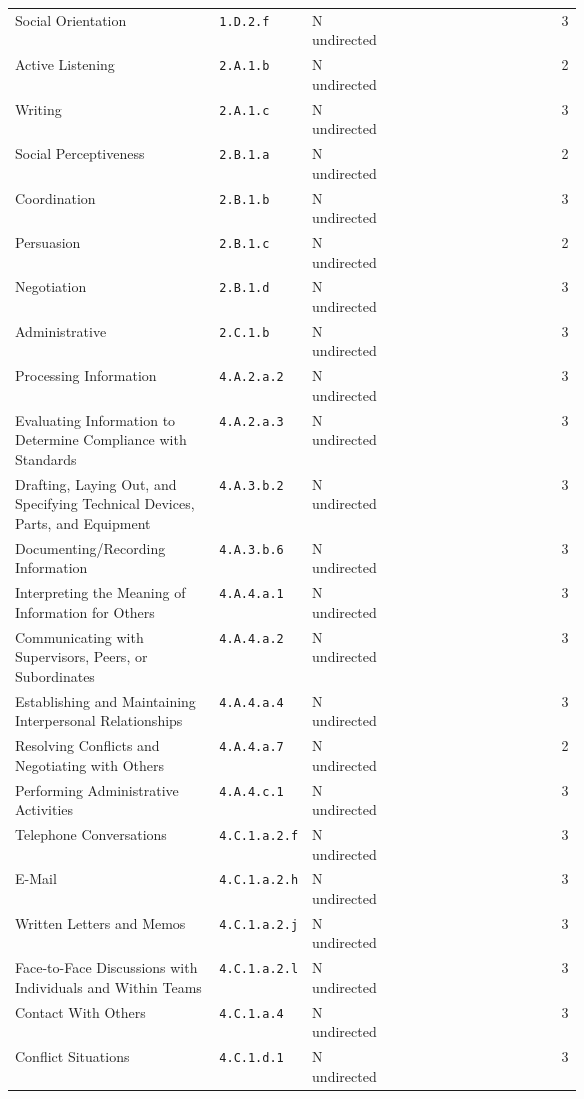 \begin{longtable}[]{@{}p{0.36\linewidth}p{0.15\linewidth}p{0.15\linewidth}cr@{}}
Social Orientation & \texttt{1.D.2.f} & N undirected & & 3 \\
Active Listening & \texttt{2.A.1.b} & N undirected & & 2 \\
Writing & \texttt{2.A.1.c} & N undirected & & 3 \\
Social Perceptiveness & \texttt{2.B.1.a} & N undirected & & 2 \\
Coordination & \texttt{2.B.1.b} & N undirected & & 3 \\
Persuasion & \texttt{2.B.1.c} & N undirected & & 2 \\
Negotiation & \texttt{2.B.1.d} & N undirected & & 3 \\
Administrative & \texttt{2.C.1.b} & N undirected & & 3 \\
Processing Information & \texttt{4.A.2.a.2} & N undirected & & 3 \\
Evaluating Information to Determine Compliance with Standards & \texttt{4.A.2.a.3} & N undirected & & 3 \\
Drafting, Laying Out, and Specifying Technical Devices, Parts, and Equipment & \texttt{4.A.3.b.2} & N undirected & & 3 \\
Documenting/Recording Information & \texttt{4.A.3.b.6} & N undirected & & 3 \\
Interpreting the Meaning of Information for Others & \texttt{4.A.4.a.1} & N undirected & & 3 \\
Communicating with Supervisors, Peers, or Subordinates & \texttt{4.A.4.a.2} & N undirected & & 3 \\
Establishing and Maintaining Interpersonal Relationships & \texttt{4.A.4.a.4} & N undirected & & 3 \\
Resolving Conflicts and Negotiating with Others & \texttt{4.A.4.a.7} & N undirected & & 2 \\
Performing Administrative Activities & \texttt{4.A.4.c.1} & N undirected & & 3 \\
Telephone Conversations & \texttt{4.C.1.a.2.f} & N undirected & & 3 \\
E-Mail & \texttt{4.C.1.a.2.h} & N undirected & & 3 \\
Written Letters and Memos & \texttt{4.C.1.a.2.j} & N undirected & & 3 \\
Face-to-Face Discussions with Individuals and Within Teams & \texttt{4.C.1.a.2.l} & N undirected & & 3 \\
Contact With Others & \texttt{4.C.1.a.4} & N undirected & & 3 \\
Conflict Situations & \texttt{4.C.1.d.1} & N undirected & & 3 \\

\end{longtable}
